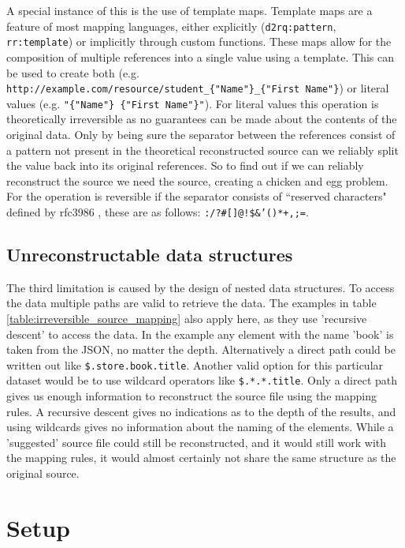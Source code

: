 A special instance of this is the use of template maps. Template maps are a feature of most mapping languages, either explicitly (\texttt{d2rq:pattern}, \texttt{rr:template}) or implicitly through custom functions. These maps allow for the composition of multiple references into a single value using a template. This can be used to create both  (e.g. \texttt{http://example.com/resource/student\_\{"Name"\}\_\{"First Name"\}}) or literal values (e.g. \texttt{"\{"Name"\} \{"First Name"\}"}). For literal values this operation is theoretically irreversible as no guarantees can be made about the contents of the original data. Only by being sure the separator between the references consist of a pattern not present in the theoretical reconstructed source can we reliably split the value back into its original references. So to find out if we can reliably reconstruct the source we need the source, creating a chicken and egg problem. For  the operation is reversible if the separator consists of ``reserved characters" defined by rfc3986 \citep{rfc3986}, these are as follows: \texttt{:/?\#[]@!\$\&'()*+,;=}.

\subsection{Unreconstructable data structures}
The third limitation is caused by the design of nested data structures. To access the data multiple paths are valid to retrieve the data. The examples in table \ref{table:irreversible_source_mapping} also apply here, as they use 'recursive descent' to access the data. In the example any element with the name 'book' is taken from the JSON, no matter the depth. Alternatively a direct path could be written out like \texttt{\$.store.book.title}. Another valid option for this particular dataset would be to use wildcard operators like \texttt{\$.*.*.title}. Only a direct path gives us enough information to reconstruct the source file using the mapping rules. A recursive descent gives no indications as to the depth of the results, and using wildcards gives no information about the naming of the elements. While a 'suggested' source file could still be reconstructed, and it would still work with the mapping rules, it would almost certainly not share the same structure as the original source.

\section{Setup}


